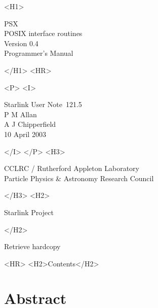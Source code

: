 \documentclass[twoside,11pt]{article}
\newcommand{\stardoccategory}  {Starlink User Note}
\newcommand{\stardocsource}    {sun\stardocnumber}
\newcommand{\stardocnumber}    {121.5}
\newcommand{\stardocauthors}   {P M Allan\\
                                A J Chipperfield}
\newcommand{\stardocdate}      {10 April 2003}
\newcommand{\stardoctitle}     {PSX \\ [1ex]
                                POSIX interface routines}
\newcommand{\stardocversion}   {Version 0.4}
\newcommand{\stardocmanual}    {Programmer's Manual}
\newcommand{\htmladdnormallink}[2]{#1}
\newcommand{\htmladdimg}[1]{}
\newcommand{\htmlref}[2]{#1}
\newcommand{\htmladdtonavigation}[1]{}
\newcommand{\xlabel}[1]{}
\renewcommand{\_}{\texttt{\symbol{95}}}
\begin{document}
\begin{htmlonly}
   \xlabel{}
   \begin{rawhtml} <H1> \end{rawhtml}
      \stardoctitle\\
      \stardocversion\\
      \stardocmanual
   \begin{rawhtml} </H1> <HR> \end{rawhtml}


   \begin{rawhtml} <P> <I> \end{rawhtml}
   \stardoccategory\ \stardocnumber \\
   \stardocauthors \\
   \stardocdate
   \begin{rawhtml} </I> </P> <H3> \end{rawhtml}
      \htmladdnormallink{CCLRC / Rutherford Appleton Laboratory}
                        {http://www.cclrc.ac.uk} \\
      \htmladdnormallink{Particle Physics \& Astronomy Research Council}
                        {http://www.pparc.ac.uk} \\
   \begin{rawhtml} </H3> <H2> \end{rawhtml}
      \htmladdnormallink{Starlink Project}{http://www.starlink.rl.ac.uk/}
   \begin{rawhtml} </H2> \end{rawhtml}
   \htmladdnormallink{\htmladdimg{source.gif} Retrieve hardcopy}
      {http://www.starlink.rl.ac.uk/cgi-bin/hcserver?\stardocsource}\\

  \label{stardoccontents}
  \begin{rawhtml} 
    <HR>
    <H2>Contents</H2>
  \end{rawhtml}
  \htmladdtonavigation{\htmlref{\htmladdimg{contents_motif.gif}}
        {stardoccontents}}

  \section{\xlabel{abstract}Abstract}
\end{htmlonly}
\end{document}
